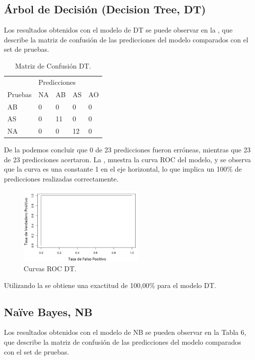 \documentclass{textolivre}
\begin{document}
\subsection{Árbol de Decisión (Decision Tree, DT)}
Los resultados obtenidos con el modelo de DT  se puede observar en la , que describe la matriz de confusión de las predicciones del modelo comparados con el set de pruebas.

\begin{table}[htpb]
\centering
\caption{Matriz de Confusión DT.}
\label{tab5}
\begin{tabular}{lllll}
\toprule 
 & \multicolumn{4}{l}{Predicciones}   \\ 
\cmidrule{2-5} 
Pruebas        & NA      & AB       & AS       & AO
\\ 
\midrule
AB             & 0       & 0        & 0        & 0
\\ 
AS             & 0       & 11       & 0        & 0
\\
NA             & 0       & 0        & 12       & 0
\\
\bottomrule
\end{tabular}
\end{table}

De la  podemos concluir que 0 de 23 predicciones fueron erróneas, mientras que 23 de 23 predicciones acertaron. La , muestra la curva ROC del modelo, y se observa que la curva es una constante 1 en el eje horizontal, lo que implica un 100\% de predicciones realizadas correctamente.

\begin{figure}[htbp]
 \centering
 \includegraphics[width=0.55\textwidth]{figura10.png}
 \caption{Curvas ROC DT.}
 \label{figura10}
\end{figure}

Utilizando la  se obtiene una exactitud de 100,00\% para el modelo DT.

\subsection{Naïve Bayes, NB}
Los resultados obtenidos con el modelo de NB  se pueden observar en la Tabla 6, que describe la matriz de confusión de las predicciones del modelo comparados con el set de pruebas.
\end{document}
